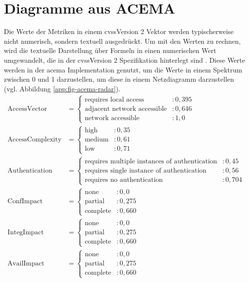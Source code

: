 \chapter{Diagramme aus ACEMA}
\label{app:acema-diagrams}
Die Werte der Metriken in einem \gls{cvss}Version 2 Vektor werden typischerweise nicht numerisch, sondern textuell ausgedrückt. Um mit den Werten zu rechnen, wird die textuelle Darstellung über Formeln in einen numerischen Wert umgewandelt, die in der \gls{cvss}Version 2 Spezifikation hinterlegt sind \autocite{CVSSV2Complete}. Diese Werte werden in der \gls{acema} Implementation genutzt, um die Werte in einem Spektrum zwischen 0 und 1 darzustellen, um diese in einem Netzdiagramm darzustellen (vgl. Abbildung \ref{app:fig-acema-radar}).
\[
\begin{aligned}
\text{AccessVector} & = 
\begin{cases} 
    \text{requires local access} & : 0{,}395 \\
    \text{adjacent network accessible} & : 0{,}646 \\
    \text{network accessible} & : 1{,}0
\end{cases} \\[10pt]
\text{AccessComplexity} & = 
\begin{cases} 
    \text{high} & : 0{,}35 \\
    \text{medium} & : 0{,}61 \\
    \text{low} & : 0{,}71
\end{cases} \\[10pt]
\text{Authentication} & = 
\begin{cases} 
    \text{requires multiple instances of authentication} & : 0{,}45 \\
    \text{requires single instance of authentication} & : 0{,}56 \\
    \text{requires no authentication} & : 0{,}704
\end{cases} \\[10pt]
\text{ConfImpact} & = 
\begin{cases} 
    \text{none} & : 0{,}0 \\
    \text{partial} & : 0{,}275 \\
    \text{complete} & : 0{,}660
\end{cases} \\[10pt]
\text{IntegImpact} & = 
\begin{cases} 
    \text{none} & : 0{,}0 \\
    \text{partial} & : 0{,}275 \\
    \text{complete} & : 0{,}660
\end{cases} \\[10pt]
\text{AvailImpact} & = 
\begin{cases} 
    \text{none} & : 0{,}0 \\
    \text{partial} & : 0{,}275 \\
    \text{complete} & : 0{,}660
\end{cases}
\end{aligned}
\]



